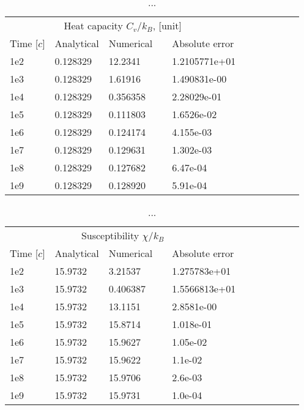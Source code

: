 \documentclass[norsk,a4paper,12pt]{article}
\begin{document}
\begin{table}[H]
\centering
\caption{...}
\label{tab:benchmark3} 
\begin{tabularx}{\textwidth}{XlXrXrXrXrX}
\toprule
\multicolumn{5}{c}{Heat capacity $C_v/k_B$, [unit]}\\
\cline{2-3}
Time [$c$]  & Analytical  & Numerical && Absolute error\\
\midrule
1e2   & 0.128329  & 12.2341   && 1.2105771e+01\\
1e3   & 0.128329  & 1.61916   && 1.490831e-00\\
1e4   & 0.128329  & 0.356358  && 2.28029e-01\\
1e5   & 0.128329  & 0.111803  && 1.6526e-02\\
1e6   & 0.128329  & 0.124174  && 4.155e-03\\
1e7 	  & 0.128329  & 0.129631  && 1.302e-03\\
1e8   & 0.128329  & 0.127682  && 6.47e-04\\
1e9   & 0.128329  & 0.128920  && 5.91e-04\\
\bottomrule
\end{tabularx}
\end{table}
\begin{table}[H]
\centering
\caption{...}
\label{tab:benchmark4} 
\begin{tabularx}{\textwidth}{XlXrXrXrXrX}
\toprule
\multicolumn{5}{c}{Susceptibility $\chi/k_B$}\\
\cline{2-3}
Time [$c$]  & Analytical  & Numerical && Absolute error\\
\midrule
1e2   & 15.9732  & 3.21537   && 1.275783e+01\\
1e3   & 15.9732  & 0.406387  && 1.5566813e+01\\
1e4   & 15.9732  & 13.1151   && 2.8581e-00\\
1e5   & 15.9732  & 15.8714   && 1.018e-01\\
1e6   & 15.9732  & 15.9627   && 1.05e-02\\
1e7 	  & 15.9732  & 15.9622   && 1.1e-02\\
1e8   & 15.9732  & 15.9706   && 2.6e-03\\
1e9   & 15.9732  & 15.9731   && 1.0e-04 \\
\bottomrule
\end{tabularx}
\end{table}
\end{document}
